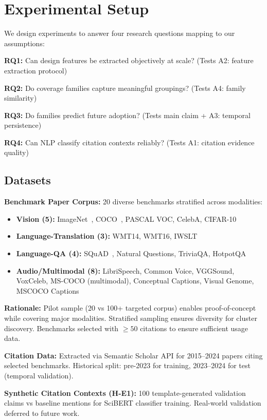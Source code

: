 \section{Experimental Setup}

We design experiments to answer four research questions mapping to our assumptions:

\textbf{RQ1:} Can design features be extracted objectively at scale? (Tests A2: feature extraction protocol)

\textbf{RQ2:} Do coverage families capture meaningful groupings? (Tests A4: family similarity)

\textbf{RQ3:} Do families predict future adoption? (Tests main claim + A3: temporal persistence)

\textbf{RQ4:} Can NLP classify citation contexts reliably? (Tests A1: citation evidence quality)

\subsection{Datasets}

\textbf{Benchmark Paper Corpus:} 20 diverse benchmarks stratified across modalities:
\begin{itemize}
\item \textbf{Vision (5):} ImageNet~\cite{imagenet}, COCO~\cite{coco}, PASCAL VOC, CelebA, CIFAR-10
\item \textbf{Language-Translation (3):} WMT14, WMT16, IWSLT
\item \textbf{Language-QA (4):} SQuAD~\cite{squad}, Natural Questions, TriviaQA, HotpotQA
\item \textbf{Audio/Multimodal (8):} LibriSpeech, Common Voice, VGGSound, VoxCeleb, MS-COCO (multimodal), Conceptual Captions, Visual Genome, MSCOCO Captions
\end{itemize}

\textbf{Rationale:} Pilot sample (20 vs 100+ targeted corpus) enables proof-of-concept while covering major modalities. Stratified sampling ensures diversity for cluster discovery. Benchmarks selected with $\geq 50$ citations to ensure sufficient usage data.

\textbf{Citation Data:} Extracted via Semantic Scholar API for 2015--2024 papers citing selected benchmarks. Historical split: pre-2023 for training, 2023--2024 for test (temporal validation).

\textbf{Synthetic Citation Contexts (H-E1):} 100 template-generated validation claims vs baseline mentions for SciBERT classifier training. Real-world validation deferred to future work.

